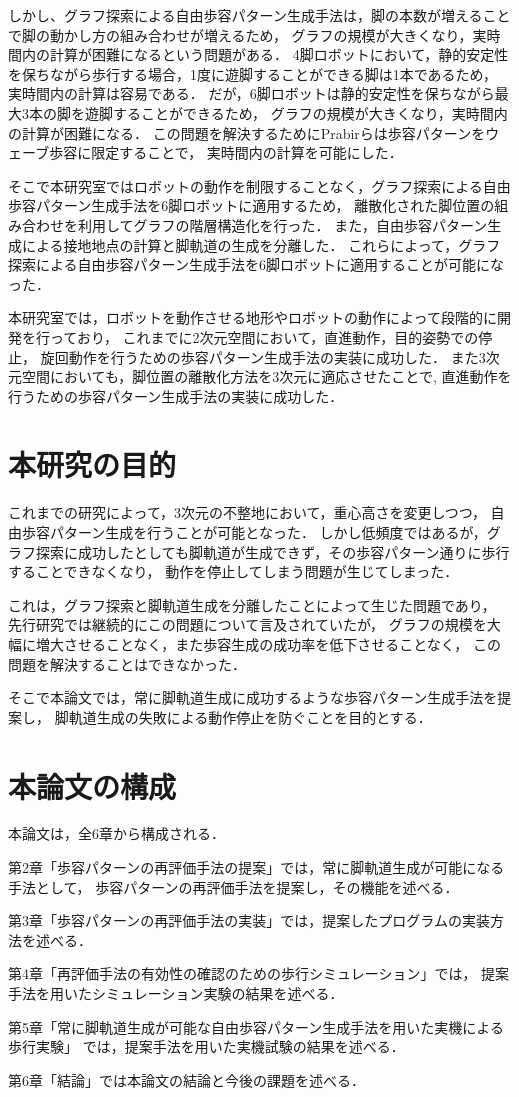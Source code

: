 しかし、グラフ探索による自由歩容パターン生成手法は，脚の本数が増えることで脚の動かし方の組み合わせが増えるため，
グラフの規模が大きくなり，実時間内の計算が困難になるという問題がある．
4脚ロボットにおいて，静的安定性を保ちながら歩行する場合，1度に遊脚することができる脚は1本であるため，
実時間内の計算は容易である\cite{Prabir_Graph_search}．
だが，6脚ロボットは静的安定性を保ちながら最大3本の脚を遊脚することができるため，
グラフの規模が大きくなり，実時間内の計算が困難になる．
この問題を解決するためにPrabirらは歩容パターンをウェーブ歩容に限定することで，
実時間内の計算を可能にした\cite{Prabir_Graph_search_Six}．

そこで本研究室ではロボットの動作を制限することなく，グラフ探索による自由歩容パターン生成手法を6脚ロボットに適用するため，
離散化された脚位置の組み合わせを利用してグラフの階層構造化を行った．
また，自由歩容パターン生成による接地地点の計算と脚軌道の生成を分離した．
これらによって，グラフ探索による自由歩容パターン生成手法を6脚ロボットに適用することが可能になった．

本研究室では，ロボットを動作させる地形やロボットの動作によって段階的に開発を行っており，
これまでに2次元空間において，直進動作\cite{Oki_Graph_search}，目的姿勢での停止\cite{Nakaoka_Graph_search}，
旋回動作\cite{Shina_Graph_search}を行うための歩容パターン生成手法の実装に成功した．
また3次元空間においても，脚位置の離散化方法を3次元に適応させたことで\cite{Miura_Graph_search},
直進動作\cite{Hato_Graph_search}を行うための歩容パターン生成手法の実装に成功した．

\section{本研究の目的}
これまでの研究によって，3次元の不整地において，重心高さを変更しつつ，
自由歩容パターン生成を行うことが可能となった．
しかし低頻度ではあるが，グラフ探索に成功したとしても脚軌道が生成できず，その歩容パターン通りに歩行することできなくなり，
動作を停止してしまう問題が生じてしまった．

これは，グラフ探索と脚軌道生成を分離したことによって生じた問題であり，
先行研究では継続的にこの問題について言及されていたが，
グラフの規模を大幅に増大させることなく，また歩容生成の成功率を低下させることなく，
この問題を解決することはできなかった．

そこで本論文では，常に脚軌道生成に成功するような歩容パターン生成手法を提案し，
脚軌道生成の失敗による動作停止を防ぐことを目的とする．

\section{本論文の構成}
本論文は，全6章から構成される．

第2章「歩容パターンの再評価手法の提案」では，常に脚軌道生成が可能になる手法として，
歩容パターンの再評価手法を提案し，その機能を述べる．

第3章「歩容パターンの再評価手法の実装」では，提案したプログラムの実装方法を述べる．

第4章「再評価手法の有効性の確認のための歩行シミュレーション」では，
提案手法を用いたシミュレーション実験の結果を述べる．

第5章「常に脚軌道生成が可能な自由歩容パターン生成手法を用いた実機による歩行実験」
では，提案手法を用いた実機試験の結果を述べる．

第6章「結論」では本論文の結論と今後の課題を述べる．
